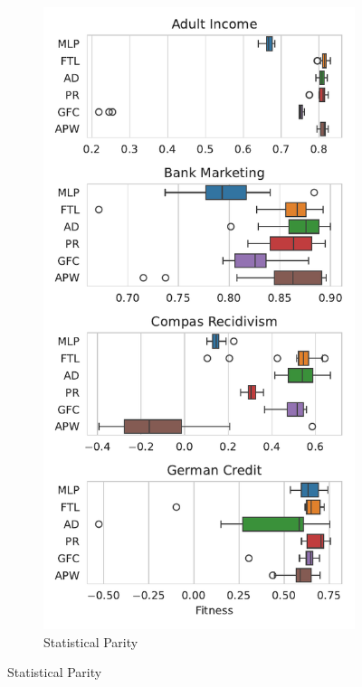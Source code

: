 \begin{figure}[!ht]
\centering
\caption{Fitness values optimizing Accuracy and multiple fairness metrics.}
\begin{subfigure}{.32\linewidth}
    \caption{Statistical Parity}
    \label{fig:boxplot_acc_parity}
    \includegraphics[width=1\linewidth]{images/boxplot_acc_parity.pdf}

\end{subfigure}
\end{figure}
